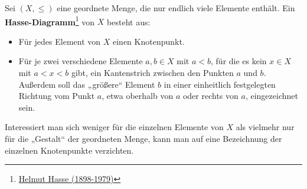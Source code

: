 \begin{de} \label{def:hasse} 
    Sei $(X,\le)$ eine geordnete Menge, die nur endlich viele Elemente enthält. Ein \textbf{Hasse-Diagramm}\footnote{\href{https://de.wikipedia.org/wiki/Helmut_Hasse}{Helmut Hasse (1898-1979)}} von $X$ besteht aus:
    \begin{itemize}
        \item Für jedes Element von $X$ einen Knotenpunkt.
        \item Für je zwei verschiedene Elemente $a,b\in X$ mit $a<b$, für die es kein $x\in X$ mit $a<x<b$ gibt, ein Kantenstrich zwischen den Punkten $a$ und $b$. Außerdem soll das „größere“ Element $b$ in einer einheitlich festgelegten Richtung vom Punkt $a$, etwa oberhalb von $a$ oder rechts von $a$, eingezeichnet sein.
    \end{itemize}
    Interessiert man sich weniger für die einzelnen Elemente von $X$ als vielmehr nur für die „Gestalt“ der geordneten Menge, kann man auf eine Bezeichnung der einzelnen Knotenpunkte verzichten.
\end{de}


